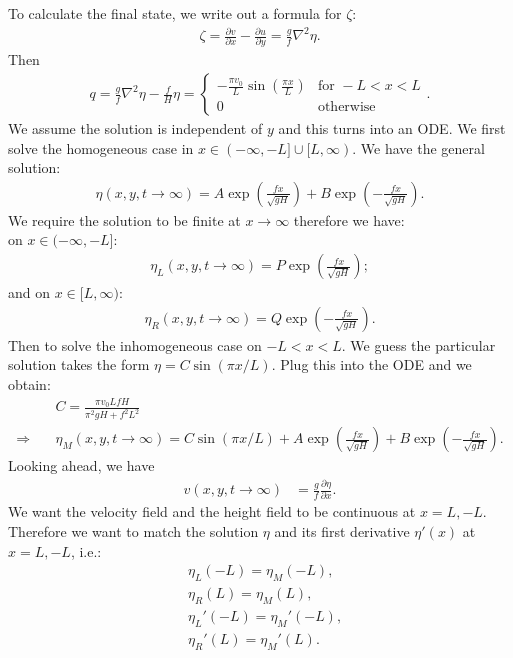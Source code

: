 \documentclass[11pt,letterpaper]{book}
\theoremstyle{definition}
\newcommand{\pe}{\partial}
\newcommand{\thus}{\Rightarrow \quad }
\begin{document}
To calculate the final state, we write out a formula for $\zeta$:
\begin{align*}
\zeta = \frac{\pe v}{\pe x}-\frac{\pe u}{\pe y} = \frac{g}{f}\nabla^2 \eta.
\end{align*}
Then
\begin{align*}
q = \frac{g}{f}\nabla^2 \eta-\frac{f}{H}\eta = \begin{cases}
-\frac{\pi v_0}{L}\sin\left(\frac{\pi x}{L}\right) &\text{for }-L<x<L\\
0 &\text{otherwise}
\end{cases}.
\end{align*}
We assume the solution is independent of $y$ and this turns into an ODE. We first solve the homogeneous case in $x\in(-\infty,-L]\cup[L,\infty)$. We have the general solution:
\begin{align*}
\eta(x,y,t\to\infty) = A \exp\left({\frac{f x}{\sqrt{gH}}}\right)+B \exp\left({-\frac{f x}{\sqrt{gH}}}\right).
\end{align*}
We require the solution to be finite at $x\to \infty$ therefore we have: \\
on $x\in(-\infty,-L]$: 
\begin{align*}
\eta_L(x,y,t\to\infty) = P \exp\left({\frac{f x}{\sqrt{gH}}}\right);
\end{align*}
and on $x\in[L,\infty)$: 
\begin{align*}
\eta_R(x,y,t\to\infty) = Q \exp\left({-\frac{f x}{\sqrt{gH}}}\right).
\end{align*}
Then to solve the inhomogeneous case on $-L<x<L$. We guess the particular solution takes the form $\eta = C\sin\left(\pi x/L\right)$. Plug this into the ODE and we obtain:
\begin{align*}
&C = \frac{\pi v_0 L fH}{\pi^2 gH+f^2L^2}\\
\thus &\eta_M(x,y,t\to\infty) =C\sin\left(\pi x/L\right)+A \exp\left({\frac{f x}{\sqrt{gH}}}\right) +B \exp\left({-\frac{f x}{\sqrt{gH}}}\right).
\end{align*}
Looking ahead, we have 
\begin{align*}
v(x,y,t\to\infty) &= \frac{g}{f}\frac{\pe \eta}{\pe x}.
\end{align*}
We want the velocity field and the height field to be continuous at $x=L, -L$. Therefore we want to match the solution $\eta$ and its first derivative $\eta'(x)$ at $x=L, -L$, i.e.:
\begin{align*}
&\eta_L(-L) = \eta_M(-L),\\
&\eta_R(L) = \eta_M(L),\\
&\eta_L'(-L) = \eta_M'(-L),\\
&\eta_R'(L) = \eta_M'(L).
\end{align*}
\end{document}
